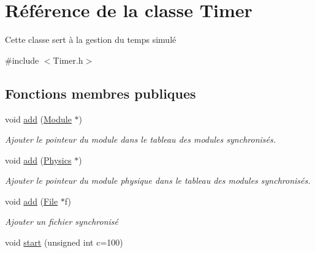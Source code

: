 \hypertarget{classTimer}{\section{Référence de la classe Timer}
\label{classTimer}
}


Cette classe sert à la gestion du temps simulé  




{\ttfamily \#include $<$Timer.\-h$>$}

\subsection*{Fonctions membres publiques}
\begin{DoxyCompactItemize}
\item 
\hypertarget{classTimer_aeae0c417d77a86462b51da0615eab8b4}{void \hyperlink{classTimer_aeae0c417d77a86462b51da0615eab8b4}{add} (\hyperlink{classModule}{Module} $\ast$)}\label{classTimer_aeae0c417d77a86462b51da0615eab8b4}

\begin{DoxyCompactList}\small\item\em Ajouter le pointeur du module dans le tableau des modules synchronisés. \end{DoxyCompactList}\item 
\hypertarget{classTimer_a6cc5f746e08a0ec915123ef9687cb691}{void \hyperlink{classTimer_a6cc5f746e08a0ec915123ef9687cb691}{add} (\hyperlink{classPhysics}{Physics} $\ast$)}\label{classTimer_a6cc5f746e08a0ec915123ef9687cb691}

\begin{DoxyCompactList}\small\item\em Ajouter le pointeur du module physique dans le tableau des modules synchronisés. \end{DoxyCompactList}\item 
\hypertarget{classTimer_a1f8e1536aeac493bb74eb92830e6b599}{void \hyperlink{classTimer_a1f8e1536aeac493bb74eb92830e6b599}{add} (\hyperlink{classFile}{File} $\ast$f)}\label{classTimer_a1f8e1536aeac493bb74eb92830e6b599}

\begin{DoxyCompactList}\small\item\em Ajouter un fichier synchronisé \end{DoxyCompactList}\item 
\hypertarget{classTimer_a62869fa83e1b76a9ebfe9cca7e56733d}{void \hyperlink{classTimer_a62869fa83e1b76a9ebfe9cca7e56733d}{start} (unsigned int c=100)}\label{classTimer_a62869fa83e1b76a9ebfe9cca7e56733d}


\end{DoxyCompactItemize}
